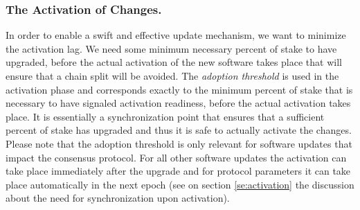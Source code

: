 {\subsubsection{The Activation of Changes.}\label{se:informal}
In order to enable a swift and effective update mechanism, we want to minimize the activation lag. 
We need some minimum necessary percent of stake to have upgraded, before the actual activation of the new software takes place that will ensure that a chain split will be avoided. The \emph{adoption threshold} is used in the activation phase and corresponds exactly to the minimum percent of stake that is necessary to have signaled activation readiness, before the actual activation takes place. It is essentially a synchronization point that ensures that a sufficient percent of stake has upgraded and thus it is safe to actually activate the changes. 
 Please note that the adoption threshold is only relevant for software updates 
 that impact the consensus protocol. For all other software updates the 
 activation can take place immediately after the upgrade and for protocol 
 parameters it can take place automatically in the next epoch (see on section 
 \ref{se:activation} the discussion about the need for synchronization upon 
 activation).

}

